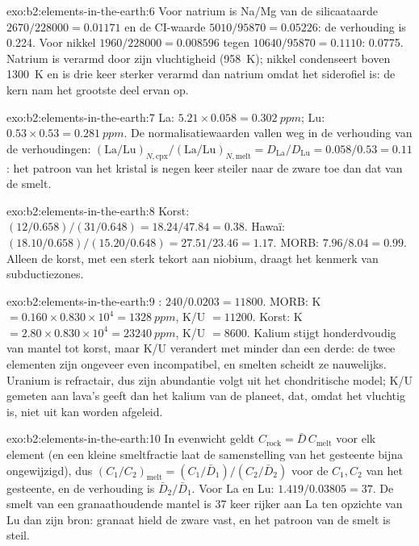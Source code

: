 \begin{solution}{exo:b2:elements-in-the-earth:6}
Voor natrium is Na/Mg van de silicaataarde $2670/\num{228000} = 0.01171$ en de CI-waarde
$5010/\num{95870} = 0.05226$: de verhouding is 0.224. Voor nikkel $1960/\num{228000}
= 0.008596$ tegen $\num{10640}/\num{95870} = 0.1110$: 0.0775. Natrium is
verarmd door zijn vluchtigheid (\qty{958}{K}); nikkel condenseert boven \qty{1300}{K} en is
drie keer sterker verarmd dan natrium omdat het siderofiel is: de kern nam het grootste deel
ervan op.
\end{solution}

\begin{solution}{exo:b2:elements-in-the-earth:7}
La: $5.21\times0.058 = \qty{0.302}{ppm}$; Lu: $0.53\times0.53 = \qty{0.281}{ppm}$. De
normalisatiewaarden vallen weg in de verhouding van de verhoudingen:
$(\mathrm{La}/\mathrm{Lu})_{N,\mathrm{cpx}}/(\mathrm{La}/\mathrm{Lu})_{N,\mathrm{melt}} =
D_{\mathrm{La}}/D_{\mathrm{Lu}} = 0.058/0.53 = 0.11$: het patroon van het kristal is negen
keer steiler naar de zware  toe dan dat van de smelt.
\end{solution}

\begin{solution}{exo:b2:elements-in-the-earth:8}
Korst: $(12/0.658)/(31/0.648) = 18.24/47.84 = 0.38$. Hawaï:
$(18.10/0.658)/(15.20/0.648) = 27.51/23.46 = 1.17$. MORB: $7.96/8.04 = 0.99$. Alleen de
korst, met een sterk tekort aan niobium, draagt het kenmerk van subductiezones.
\end{solution}

\begin{solution}{exo:b2:elements-in-the-earth:9}
: $240/0.0203 = \num{11800}$. MORB: K $= 0.160\times0.830\times10^4 =
\qty{1328}{ppm}$, K/U $= \num{11200}$. Korst: K $= 2.80\times0.830\times10^4 =
\qty{23240}{ppm}$, K/U $= \num{8600}$. Kalium stijgt honderdvoudig van mantel tot korst,
maar K/U verandert met minder dan een derde: de twee elementen zijn ongeveer even incompatibel,
en smelten scheidt ze nauwelijks. Uranium is refractair, dus zijn abundantie volgt uit
het chondritische model; K/U gemeten aan lava's geeft dan het kalium van de planeet, dat,
omdat het vluchtig is, niet uit  kan worden afgeleid.
\end{solution}

\begin{solution}{exo:b2:elements-in-the-earth:10}
In evenwicht geldt $C_{\mathrm{rock}} = \bar D\,C_{\mathrm{melt}}$ voor elk element (en een
kleine smeltfractie laat de samenstelling van het gesteente bijna ongewijzigd), dus
$(C_1/C_2)_{\mathrm{melt}} = (C_{1}/\bar D_1)/(C_{2}/\bar D_2)$ voor de $C_1,
C_2$ van het gesteente, en de verhouding is $\bar D_2/\bar D_1$. Voor La en Lu: $1.419/0.03805 = 37$. De smelt
van een granaathoudende mantel is 37 keer rijker aan La ten opzichte van Lu dan zijn bron: granaat
hield de zware  vast, en het patroon van de smelt is steil.
\end{solution}

